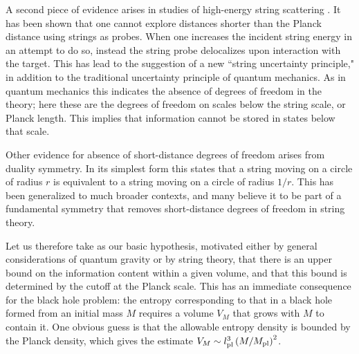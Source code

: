 A second piece of evidence arises in studies of high-energy string
scattering .  It has been shown that  one
cannot explore distances shorter than the Planck distance using strings
as probes. When one increases the incident string energy in an
attempt to do so, instead the string probe
delocalizes upon interaction
with the target.  This has lead to the suggestion of a new ``string
uncertainty principle," in addition to the
traditional uncertainty principle of quantum mechanics.  As in
quantum mechanics this indicates the absence of degrees of freedom in
the theory; here these are the degrees of freedom on scales below the
string scale, or
Planck length.  This implies that information cannot be stored in
states below that scale.

Other evidence for absence of short-distance degrees of freedom
arises from duality symmetry. 	In its simplest form
this states that
a string moving on a circle of radius $r$ is equivalent to a string
moving on a circle of radius $1/r$.  This has been generalized to
much broader contexts, and many believe it to be part of a
fundamental symmetry that removes short-distance degrees of freedom
in string theory.

Let us therefore take as our basic hypothesis, motivated either by general
considerations of quantum gravity or by string theory, that there is
an
upper bound on the information content within a given volume, and that this
bound is
determined by the cutoff at the Planck scale.
This has an immediate consequence for the black hole problem:
the entropy corresponding to that in a black hole formed from an initial
mass $M$ requires a volume $V_M$ that grows with $M$ to contain it.
One obvious guess is that the allowable
entropy density is bounded by the Planck density, which gives the estimate
$V_M\sim l_{\rm pl}^3 \left(M/M_{\rm pl}\right)^2$.

